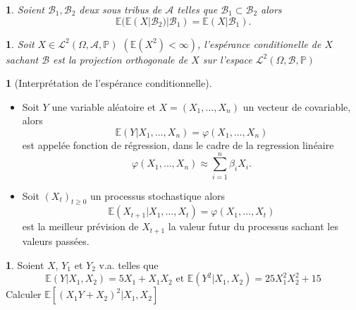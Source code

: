 \documentclass[8pt,notheorems]{beamer}
\def \E{\mathbb E}
\renewcommand{\Pr}{\mathbb{P}}
\newtheorem{theorem}{\translate{Theorem}}[section]
\newtheorem{theorem}{\translate{Theoreme}}
\newtheorem{prop}{\translate{Proposition}}
\theoremstyle{definition}
\theoremstyle{example}
\newtheorem{example}{\translate{Exemple}}
\newtheorem{remark}{\translate{Remarque}}
\theoremstyle{mystyle}
\theoremstyle{plain}
\begin{document}
\begin{frame}[allowframebreaks]
\begin{prop}
Soient $\mathcal{B}_1, \mathcal{B}_2$ deux sous tribus de $\mathcal{A}$ telles que $\mathcal{B}_1\subset \mathcal{B}_2$   alors 
$$
\E(\E(X|\mathcal{B}_2)|\mathcal{B}_1) = \E(X|\mathcal{B}_1).
$$
\end{prop}
\begin{theorem}
Soit $X\in \mathcal{L}^2(\Omega, \mathcal{A}, \Pr)$ $(\E(X^2)<\infty)$, l'espérance conditionelle de $X$ sachant $\mathcal{B}$ est la projection orthogonale de $X$ sur l'espace $\mathcal{L}^2(\Omega, \mathcal{B}, \Pr)$ 
\end{theorem}
\begin{remark}[Interprétation de l'espérance conditionnelle]
\begin{itemize}
    \item Soit $Y$ une variable aléatoire et $X = (X_1,\ldots, X_n)$ un vecteur de covariable, alors 
    $$
    \E(Y|X_1,\ldots, X_n) = \varphi(X_1,\ldots, X_n)
    $$
    est appelée fonction de régression, dans le cadre de la regression linéaire  
    $$
    \varphi(X_1,\ldots, X_n) \approx \sum_{i= 1}^n\beta_i X_i.
    $$
    \item Soit $(X_t)_{t\geq 0}$ un processus stochastique alors 
        $$
    \E(X_{t+1}|X_1,\ldots, X_t) = \varphi(X_1,\ldots, X_t)
    $$
    est la meilleur prévision de $X_{t+1}$ la valeur futur du processus sachant les valeurs passées. 
\end{itemize}
\end{remark}
\begin{example}
Soient $X$, $Y_1$ et $Y_2$ v.a. telles que
\begin{equation*}
\mathbb{E}(Y|X_1,X_2)=5X_1+X_1X_2 \text{ et } \mathbb{E}(Y^{2}|X_1,X_2)=25X_1^{2}X_2^{2}+15
\end{equation*}
Calculer $\mathbb{E}\left[\left(X_1Y+X_2\right)^{2}\big\rvert X_1,X_2\right]$  
\end{example}
\end{frame}
\end{document}
